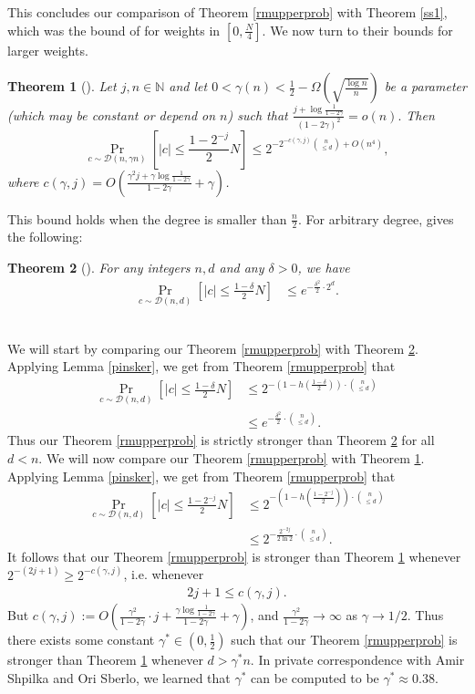 \documentclass[12pt]{article}
\newtheorem{theorem}{Theorem}
\newcommand{\N}{\mathbb{N}}
\begin{document}
This concludes our comparison of Theorem \ref{rmupperprob} with Theorem \ref{ss1}, which was the bound of \cite{sberlo2020weightbound} for weights in $[0,\frac{N}{4}].$ We now turn to their bounds for larger weights.
\begin{theorem}[\cite{sberlo2020weightbound}]\label{ss2}
Let $j,n\in\N$ and let $0<\gamma(n)<\frac{1}{2}-\Omega\left(  \sqrt{\frac{\log n}{n}}\right)$ be a parameter (which may be constant or depend on $n$) such that $\frac{j+\log\frac{1}{1-2\gamma}}{(1-2\gamma)^2}=o(n).$ Then
$$\Pr_{c\sim\mathcal{D}(n,\gamma n)}[|c|\leq \frac{1-2^{-j}}{2}N]\leq 2^{-2^{-c(\gamma,j)}\binom{n}{\leq d}+O(n^4)},$$
where $c(\gamma,j)=O\left( \frac{\gamma^2 j+\gamma\log\frac{1}{1-2\gamma}}{1-2\gamma}+\gamma\right)$.
\end{theorem}
This bound holds when the degree is smaller than $\frac{n}{2}$. For arbitrary degree, \cite{sberlo2020weightbound} gives the following:
\begin{theorem}[\cite{sberlo2020weightbound}]\label{ss3}
For any integers $n,d$ and any $\delta>0$, we have
\begin{align*}
 \Pr_{c\sim\mathcal{D}(n,d)}[|c|\leq \frac{1-\delta}{2}N]&\leq e^{-\frac{\delta^2}{2}\cdot 2^d}.
\end{align*}
\end{theorem}
\hfill\\
We will start by comparing our Theorem \ref{rmupperprob} with Theorem \ref{ss3}. Applying Lemma \ref{pinsker}, we get from Theorem \ref{rmupperprob} that
\begin{align*}
    \Pr_{c\sim\mathcal{D}(n,d)}[|c|\leq \frac{1-\delta}{2}N]&\leq 2^{-(1-h(\frac{1-\delta}{2}))\cdot\binom{n}{\leq d}}\\
    &\leq e^{-\frac{\delta^2}{2}\cdot \binom{n}{\leq d}}.
\end{align*}
Thus our Theorem \ref{rmupperprob} is strictly stronger than Theorem \ref{ss3} for all $d<n$. We will now compare our Theorem \ref{rmupperprob} with Theorem \ref{ss2}. Applying Lemma \ref{pinsker}, we get from Theorem \ref{rmupperprob} that
\begin{align*}
    \Pr_{c\sim\mathcal{D}(n,d)}[|c|\leq \frac{1-2^{-j}}{2}N]&\leq 2^{-(1-h(\frac{1-2^{-j}}{2}))\cdot \binom{n}{\leq d}}\\
    &\leq 2^{-\frac{2^{-2j}}{2\ln2}\cdot \binom{n}{\leq d}}.
\end{align*}
It follows that our Theorem \ref{rmupperprob} is stronger than Theorem \ref{ss2} whenever $2^{-(2j+1)}\geq 2^{-c(\gamma,j)}$, i.e. whenever
\begin{align*}
    2j+1\leq c(\gamma,j).
\end{align*}
But $c(\gamma,j):=O\left( \frac{\gamma^2 }{1-2\gamma}\cdot j+\frac{\gamma\log\frac{1}{1-2\gamma}}{1-2\gamma}+\gamma\right)$, and 
$\frac{\gamma^2 }{1-2\gamma}\rightarrow\infty$
as $\gamma\rightarrow 1/2$. Thus there exists some constant $\gamma^*\in (0,\frac{1}{2})$ such that our Theorem \ref{rmupperprob} is stronger than Theorem \ref{ss2} whenever $d>\gamma^* n$. In private correspondence with Amir Shpilka and Ori Sberlo, we learned that $\gamma^*$ can be computed to be $\gamma^*\approx 0.38$.
\end{document}
